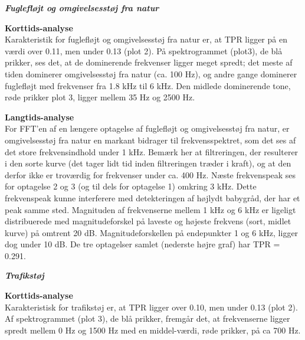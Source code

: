 
\newpage
\begin{center} \textit{\textbf{Fuglefløjt og omgivelsesstøj fra natur}} \end{center}
\textbf{Korttids-analyse} \\
Karakteristik for fuglefløjt og omgivelsesstøj fra natur er, at TPR ligger på en værdi over 0.11, men under 0.13 (plot 2). På spektrogrammet (plot3), de blå prikker, ses det, at de dominerende frekvenser ligger meget spredt; det meste af tiden dominerer omgivelsesstøj fra natur (ca. 100 Hz), og andre gange dominerer fuglefløjt med frekvenser fra 1.8 kHz til 6 kHz. Den midlede dominerende tone, røde prikker plot 3, ligger mellem 35 Hz og 2500 Hz.


\newpage
\textbf{Langtids-analyse} \\
For FFT'en af en længere optagelse af fuglefløjt og omgivelsesstøj fra natur, er omgivelsesstøj fra natur en markant bidrager til frekvensspektret, som det ses af det store frekvensindhold under 1 kHz. Bemærk her at filtreringen, der resulterer i den sorte kurve (det tager lidt tid inden filtreringen træder i kraft), og at den derfor ikke er troværdig for frekvenser under ca. 400 Hz. Næste frekvenspeak ses for optagelse 2 og 3 (og til dels for optagelse 1) omkring 3 kHz. Dette frekvenspeak kunne interferere med detekteringen af højlydt babygråd, der har et peak samme sted. Magnituden af frekvenserne mellem 1 kHz og 6 kHz er ligeligt distribuerede med magnitudeforskel på laveste og højeste frekvens (sort, midlet kurve) på omtrent 20 dB. Magnitudeforskellen på endepunkter 1 og 6 kHz, ligger dog under 10 dB.
De tre optagelser samlet (nederste højre graf) har TPR = 0.291.


\newpage
\begin{center}\textit{\textbf{Trafikstøj}}\end{center}
\textbf{Korttids-analyse} \\
Karakteristisk for trafikstøj er, at TPR ligger over 0.10, men under 0.13 (plot 2). Af spektrogrammet (plot 3), de blå prikker, fremgår det, at frekvenserne ligger spredt mellem 0 Hz og 1500 Hz med en middel-værdi, røde prikker, på ca 700 Hz.

